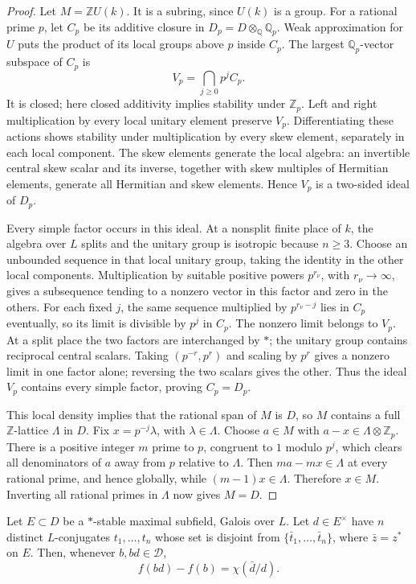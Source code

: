 \begin{proof}
Let $M=\mathbb Z U(k)$. It is a subring, since $U(k)$ is a group.
For a rational prime $p$, let $C_p$ be its additive closure in
$D_p=D\otimes_{\mathbb Q}\mathbb Q_p$. Weak approximation for $U$
puts the product of its local groups above $p$ inside $C_p$. The largest
$\mathbb Q_p$-vector subspace of $C_p$ is
\[
 V_p=\bigcap_{j\ge0}p^jC_p.
\]
It is closed; here closed additivity implies stability under
$\mathbb Z_p$. Left and right multiplication by every local unitary
element preserve $V_p$. Differentiating these actions shows stability
under multiplication by every skew element, separately in each local
component. The skew elements generate the local algebra: an invertible
central skew scalar and its inverse, together with skew multiples of
Hermitian elements, generate all Hermitian and skew elements. Hence
$V_p$ is a two-sided ideal of $D_p$.

Every simple factor occurs in this ideal. At a nonsplit finite place of
$k$, the algebra over $L$ splits and the unitary group is isotropic
because $n\ge3$. Choose an unbounded sequence in that local unitary
group, taking the identity in the other local components. Multiplication
by suitable positive powers $p^{r_\nu}$, with $r_\nu\to\infty$, gives
a subsequence tending to a nonzero vector in this factor and zero in
the others. For each fixed $j$, the same sequence multiplied by
$p^{r_\nu-j}$ lies in $C_p$ eventually, so its limit is divisible by
$p^j$ in $C_p$. The nonzero limit belongs to $V_p$.
At a split place the two factors are interchanged by $*$; the unitary
group contains reciprocal central scalars. Taking $(p^{-r},p^r)$ and
scaling by $p^r$ gives a nonzero limit in one factor alone; reversing the
two scalars gives the other. Thus the ideal $V_p$ contains every simple
factor, proving $C_p=D_p$.

This local density implies that the rational span of $M$ is $D$, so
$M$ contains a full $\mathbb Z$-lattice $\Lambda$ in $D$. Fix
$x=p^{-j}\lambda$, with $\lambda\in\Lambda$. Choose $a\in M$ with
$a-x\in\Lambda\otimes\mathbb Z_p$. There is a positive integer $m$
prime to $p$, congruent to $1$ modulo $p^j$, which clears all denominators
of $a$ away from $p$ relative to $\Lambda$. Then
$ma-mx\in\Lambda$ at every rational prime, and hence globally, while
$(m-1)x\in\Lambda$. Therefore $x\in M$. Inverting all rational primes
in $\Lambda$ now gives $M=D$.
\end{proof}

\begin{proposition}\label{prop:chars-difference}
Let $E\subset D$ be a $*$-stable maximal subfield, Galois over $L$.
Let $d\in E^\times$ have $n$ distinct $L$-conjugates
$t_1,\ldots,t_n$ whose set is disjoint from
$\{\bar t_1,\ldots,\bar t_n\}$, where $\bar z=z^*$ on $E$.
Then, whenever $b,bd\in\mathcal D$,
\begin{equation}\label{eq:chars-difference}
 f(bd)-f(b)=\chi(\bar d/d).
\end{equation}
\end{proposition}

